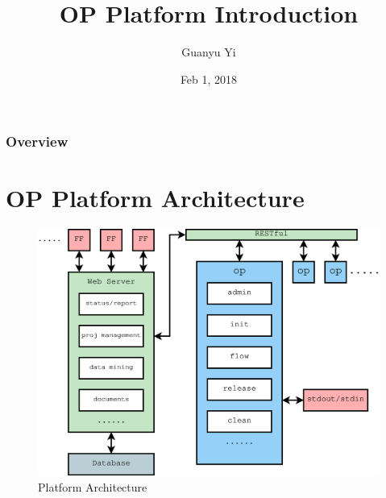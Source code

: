 \documentclass{beamer}
\title[OP platform introduction]{OP Platform Introduction} %
\author{Guanyu Yi} %
\institute[Alchip] %
{
  OP Team, Alchip, Inc. \\ %
  \medskip
  \textit{guanyu\_yi@alchip.com} %
}
\date{Feb 1, 2018} %
\begin{document}
\begin{frame}
  \titlepage %
\end{frame}

\begin{frame}
  \frametitle{Overview} %
  \tableofcontents %
\end{frame}


\section{OP Platform Architecture} %

\begin{frame}
  \begin{figure}
    \centering
    \includegraphics[width=0.98\linewidth]{pp_struc}
    \caption{Platform Architecture}
  \end{figure}
\end{frame}
\end{document}
